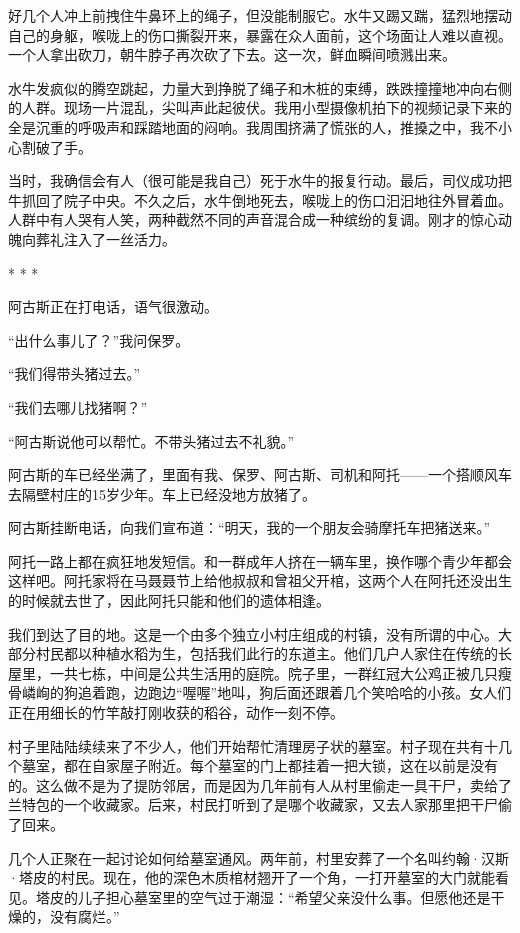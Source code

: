 \documentclass[12pt,oneside]{book}
\begin{document}
\begin{bookref}[frametitle={\cite{好好告别：世界葬礼观察手记}}]
好几个人冲上前拽住牛鼻环上的绳子，但没能制服它。水牛又踢又踹，猛烈地摆动自己的身躯，喉咙上的伤口撕裂开来，暴露在众人面前，这个场面让人难以直视。一个人拿出砍刀，朝牛脖子再次砍了下去。这一次，鲜血瞬间喷溅出来。

水牛发疯似的腾空跳起，力量大到挣脱了绳子和木桩的束缚，跌跌撞撞地冲向右侧的人群。现场一片混乱，尖叫声此起彼伏。我用小型摄像机拍下的视频记录下来的全是沉重的呼吸声和踩踏地面的闷响。我周围挤满了慌张的人，推搡之中，我不小心割破了手。

当时，我确信会有人（很可能是我自己）死于水牛的报复行动。最后，司仪成功把牛抓回了院子中央。不久之后，水牛倒地死去，喉咙上的伤口汩汩地往外冒着血。人群中有人哭有人笑，两种截然不同的声音混合成一种缤纷的复调。刚才的惊心动魄向葬礼注入了一丝活力。

\begin{center}
* * *
\end{center}

阿古斯正在打电话，语气很激动。

“出什么事儿了？”我问保罗。

“我们得带头猪过去。”

“我们去哪儿找猪啊？”

“阿古斯说他可以帮忙。不带头猪过去不礼貌。”

阿古斯的车已经坐满了，里面有我、保罗、阿古斯、司机和阿托——一个搭顺风车去隔壁村庄的15岁少年。车上已经没地方放猪了。

阿古斯挂断电话，向我们宣布道：“明天，我的一个朋友会骑摩托车把猪送来。”

阿托一路上都在疯狂地发短信。和一群成年人挤在一辆车里，换作哪个青少年都会这样吧。阿托家将在马聂聂节上给他叔叔和曾祖父开棺，这两个人在阿托还没出生的时候就去世了，因此阿托只能和他们的遗体相逢。

我们到达了目的地。这是一个由多个独立小村庄组成的村镇，没有所谓的中心。大部分村民都以种植水稻为生，包括我们此行的东道主。他们几户人家住在传统的长屋里，一共七栋，中间是公共生活用的庭院。院子里，一群红冠大公鸡正被几只瘦骨嶙峋的狗追着跑，边跑边“喔喔”地叫，狗后面还跟着几个笑哈哈的小孩。女人们正在用细长的竹竿敲打刚收获的稻谷，动作一刻不停。

村子里陆陆续续来了不少人，他们开始帮忙清理房子状的墓室。村子现在共有十几个墓室，都在自家屋子附近。每个墓室的门上都挂着一把大锁，这在以前是没有的。这么做不是为了提防邻居，而是因为几年前有人从村里偷走一具干尸，卖给了兰特包的一个收藏家。后来，村民打听到了是哪个收藏家，又去人家那里把干尸偷了回来。

几个人正聚在一起讨论如何给墓室通风。两年前，村里安葬了一个名叫约翰·汉斯·塔皮的村民。现在，他的深色木质棺材翘开了一个角，一打开墓室的大门就能看见。塔皮的儿子担心墓室里的空气过于潮湿：“希望父亲没什么事。但愿他还是干燥的，没有腐烂。”


\end{bookref}
\end{document}

